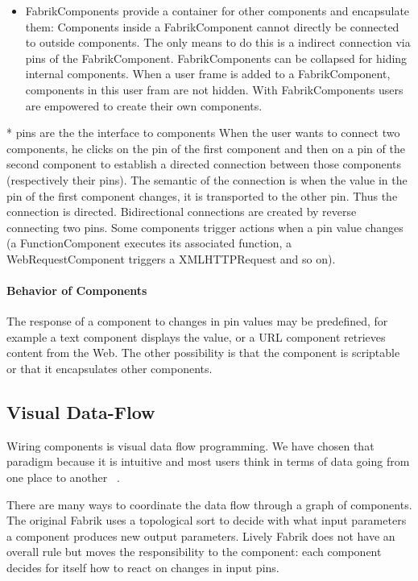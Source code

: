 \documentclass[pdftex, times, 10pt, twocolumn]{article}
\begin{document}
\begin{itemize}
  \item FabrikComponents provide a container for other components and encapsulate them: Components inside a FabrikComponent cannot directly be connected to outside components. The only means to do this is a indirect connection via pins of the FabrikComponent. FabrikComponents can be collapsed for hiding internal components. When a user frame is added to a FabrikComponent, components in this user fram are not hidden. With FabrikComponents users are empowered to create their own components. 


\end{itemize}
* pins are the the interface to components When the user wants to connect two components, he clicks on the pin of the first component and then on a pin of the second component to establish a directed connection between those components (respectively their pins). The semantic of the connection is when the value in the pin of the first component changes, it is transported to the other pin. Thus the connection is directed. Bidirectional connections are created by reverse connecting two pins. Some components trigger actions when a pin value changes (a FunctionComponent executes its associated function, a WebRequestComponent triggers a XMLHTTPRequest and so on). 

\paragraph{Behavior of Components}
The response of a component to changes in pin values may be predefined, for example a text component displays the value, or a URL component retrieves content from the Web. The other possibility is that the component is scriptable or that it encapsulates other components. 



\subsection{Visual Data-Flow}
Wiring components is visual data flow programming. We have chosen that paradigm because it is intuitive and most users think in terms of data going from one place to another ~\cite{Baroth1995VPR,Johnston2004ADP}. 

There are many ways to coordinate the data flow through a graph of components. The original Fabrik uses a topological sort to decide with what input parameters a component produces new output parameters. Lively Fabrik does not have an overall rule but moves the responsibility to the component: each component decides for itself how to react on changes in input pins.   
\end{document}
